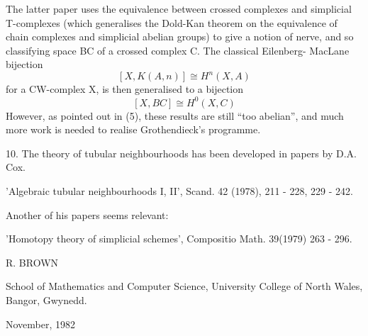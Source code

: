 
The latter paper uses the equivalence between crossed complexes
and simplicial T-complexes (which generalises the Dold-Kan
theorem on the equivalence of chain complexes and simplicial
abelian groups) to give a notion of nerve, and so classifying
space BC of a crossed complex C. The classical Eilenberg-%
MacLane bijection
\[ [X, K(A, n)] \cong H^{n} (X, A) \]
for a CW-complex X, is then generalised to a bijection
\[ [X, BC] \cong H^{0} (X, C) \]
However, as pointed out in (5), these results are still ``too
abelian'', and much more work is needed to realise Grothendieck's
programme.

10. The theory of tubular neighbourhoods has been developed in papers
by D.A. Cox.

'Algebraic tubular neighbourhoods I, II',  Scand. 42 (1978),
211 - 228, 229 - 242.

Another of his papers seems relevant:

'Homotopy theory of simplicial schemes', Compositio Math. 39(1979)
263 - 296.

R. BROWN

School of Mathematics and Computer Science,
University College of North Wales,
Bangor,
Gwynedd. 

November, 1982


